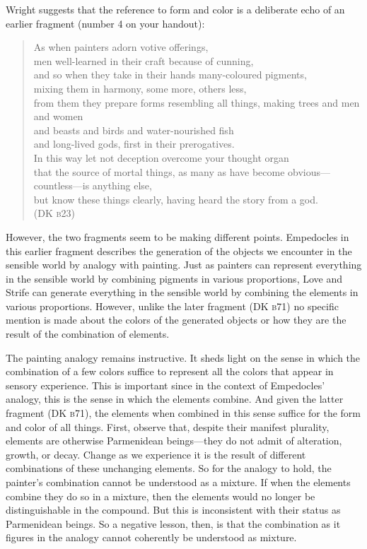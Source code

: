 Wright suggests that the reference to form and color is a deliberate echo of an earlier fragment (number 4 on your handout):
\begin{verse}
    As when painters adorn votive offerings,\\
    men well-learned in their craft because of cunning,\\
    and so when they take in their hands many-coloured pigments,\\
    mixing them in harmony, some more, others less,\\
    from them they prepare forms resembling all things,
    making trees and men and women\\
    and beasts and birds and water-nourished fish\\
    and long-lived gods, first in their prerogatives.\\
    In this way let not deception overcome your thought organ\\
    that the source of mortal things, as many as have become obvious---countless---is anything else,\\
    but know these things clearly, having heard the story from a god.\\ 
    (DK \textsc{b}23)
\end{verse}
However, the two fragments seem to be making different points. Empedocles in this earlier fragment describes the generation of the objects we encounter in the sensible world by analogy with painting. Just as painters can represent everything in the sensible world by combining pigments in various proportions, Love and Strife can generate everything in the sensible world by combining the elements in various proportions. However, unlike the later fragment (DK \textsc{b}71) no specific mention is made about the colors of the generated objects or how they are the result of the combination of elements.

The painting analogy remains instructive. It sheds light on the sense in which the combination of a few colors suffice to represent all the colors that appear in sensory experience. This is important since in the context of Empedocles' analogy, this is the sense in which the elements combine. And given the latter fragment (DK \textsc{b}71), the elements when combined in this sense suffice for the form and color of all things. First, observe that, despite their manifest plurality, elements are otherwise Parmenidean beings---they do not admit of alteration, growth, or decay. Change as we experience it is the result of different combinations of these unchanging elements. So for the analogy to hold, the painter's combination cannot be understood as a mixture. If when the elements combine they do so in a mixture, then the elements would no longer be distinguishable in the compound. But this is inconsistent with their status as Parmenidean beings. So a negative lesson, then, is that the combination as it figures in the analogy cannot coherently be understood as mixture.

